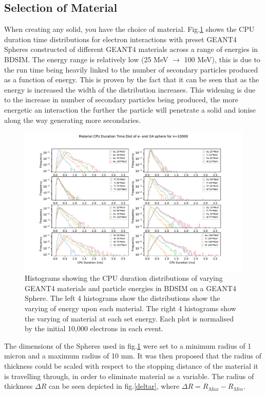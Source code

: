 \documentclass[12pt,a4paper]{article}
\begin{document}
\subsection{Selection of Material}
When creating any solid, you have the choice of material. Fig.\ref{novar} shows the CPU duration time distributions for electron interactions with preset GEANT4 Spheres constructed of different GEANT4 materials across a range of energies in BDSIM. The energy range is relatively low (25 MeV $\rightarrow$ 100 MeV), this is due to the run time being heavily linked to the number of secondary particles produced as a function of energy. This is proven by the fact that it can be seen that as the energy is increased the width of the distribution increases. This widening is due to the increase in number of secondary particles being produced, the more energetic an interaction the further the particle will penetrate a solid and ionise along the way generating more secondaries.
\begin{figure}[h!]
\centering
\includegraphics[scale=0.6]{Images//Materials//not_Varied_by_radius_and_secondaries.pdf}
\caption[width=\columnwidth]{Histograms showing the CPU duration distributions of varying GEANT4 materials and particle energies in BDSIM on a GEANT4 Sphere. The left 4 histograms show the distributions show the varying of energy upon each material. The right 4 histograms show the varying of material at each set energy. Each plot is normalised by the initial 10,000 electrons in each event.}
\label{novar}
\end{figure}
\newpage
\noindent The dimensions of the Spheres used in fig.\ref{novar} were set to a minimum radius of 1 micron and a maximum radius of 10 mm. It was then proposed that the radius of thickness could be scaled with respect to the stopping distance of the material it is travelling through, in order to eliminate material as a variable. The radius of thickness $\Delta R$ can be seen depicted in fig.\ref{deltar}, where $\Delta R = R_{Max} - R_{Min}$.
\end{document}
